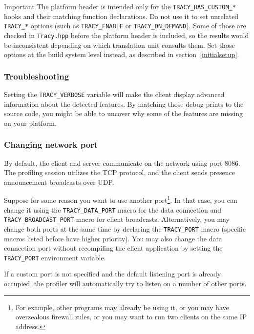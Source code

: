 \documentclass[hidelinks,titlepage,a4paper,twoside]{article}
\begin{document}
\begin{bclogo}[
noborder=true,
couleur=black!5,
logo=\bcbombe
]{Important}
The platform header is intended only for the \texttt{TRACY\_HAS\_CUSTOM\_*} hooks and their matching function declarations. Do not use it to set unrelated \texttt{TRACY\_*} options (such as \texttt{TRACY\_ENABLE} or \texttt{TRACY\_ON\_DEMAND}). Some of those are checked in \texttt{Tracy.hpp} before the platform header is included, so the results would be inconsistent depending on which translation unit consults them. Set those options at the build system level instead, as described in section~\ref{initialsetup}.
\end{bclogo}

\subsubsection{Troubleshooting}

Setting the \texttt{TRACY\_VERBOSE} variable will make the client display advanced information about the detected features. By matching those debug prints to the source code, you might be able to uncover why some of the features are missing on your platform.

\subsubsection{Changing network port}

By default, the client and server communicate on the network using port 8086. The profiling session utilizes the TCP protocol, and the client sends presence announcement broadcasts over UDP.

Suppose for some reason you want to use another port\footnote{For example, other programs may already be using it, or you may have overzealous firewall rules, or you may want to run two clients on the same IP address.}. In that case, you can change it using the \texttt{TRACY\_DATA\_PORT} macro for the data connection and \texttt{TRACY\_BROADCAST\_PORT} macro for client broadcasts. Alternatively, you may change both ports at the same time by declaring the \texttt{TRACY\_PORT} macro (specific macros listed before have higher priority). You may also change the data connection port without recompiling the client application by setting the \texttt{TRACY\_PORT} environment variable.

If a custom port is not specified and the default listening port is already occupied, the profiler will automatically try to listen on a number of other ports.
\end{document}
